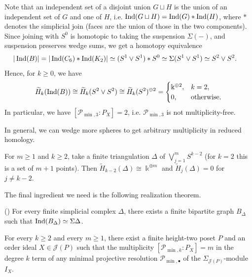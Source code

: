 \documentclass[a4paper,leqno]{amsart}
\begin{document}
\begin{eg}
Note that an independent set of a disjoint union $G\sqcup H$ is the union of an independent set of $G$ and one of $H$, i.e. $\operatorname{Ind}(G\sqcup H)=\operatorname{Ind}(G)\ast \operatorname{Ind}(H)$, where $\ast$ denotes the simplicial join (faces are the union of those in the two components).  Since joining with $S^0$ is homotopic to taking the suspension $\Sigma(-)$, and suspension preserves wedge sums, we get a homotopy equivalence
\begin{align*}
 |\operatorname{Ind}(B)|
 &=|\operatorname{Ind}(C_6)*\operatorname{Ind}(K_2)| \simeq(S^1\vee S^1)*S^0
 \simeq\Sigma(S^1\vee S^1)\simeq S^2\vee S^2.
\end{align*}
Hence, for $k\ge 0$, we have
\[
\widetilde{H}_k(\operatorname{Ind}(B)) \cong  \widetilde{H}_k(S^2\vee S^2) \cong \widetilde{H}_k(S^2)^{\oplus 2} = \begin{cases}
    \Bbbk^{\oplus 2}, & k=2, \\ 0, & \text{otherwise.}
\end{cases}
\]
In particular, we have $[\mathcal{P}_{\min,3}:P_X]=2$, i.e. $\mathcal P_{\min,3}$ is not multiplicity-free.
\end{eg}

In general, we can wedge more spheres to get arbitrary multiplicity in reduced homology.

\begin{eg}\label{eg:complexes-with-arbitrary-homology}
For $m\geq1$ and $k\ge 2$, take a finite triangulation $\Delta$ of $\bigvee_{j=1}^{m}S^{k-2}$ (for $k=2$ this is a set of $m+1$ points). Then $\widetilde H_{k-2}(\Delta)\cong\Bbbk^{\oplus m}$ and $\widetilde H_j(\Delta)=0$ for $j\neq k-2$.
\end{eg}

The final ingredient we need is the following realization theorem.

\begin{prop}\textnormal{(\cite[Proposition~6.2]{NR09})}
\label{prop:nagel-reiner}
For every finite simplicial complex $\Delta$, there exists a finite bipartite graph $B_\Delta$ such that $\operatorname{Ind}(B_\Delta)\simeq\Sigma \Delta$.
\end{prop}

\begin{cor}\label{cor:arbitrary-higher-multiplicities}
For every $k\geq2$ and every $m\geq1$, there exist a finite height-two poset $P$ and an order ideal $X\in\mathcal J(P)$ such that the multiplicity $[\mathcal{P}_{\min,k}:P_X]=m$ in the degree $k$ term of any minimal projective resolution $\mathcal{P}_{\min,\bullet}$ of the $\Sigma_{\mathcal{J}(P)}$-module $I_X$.
\end{cor}
\end{document}
